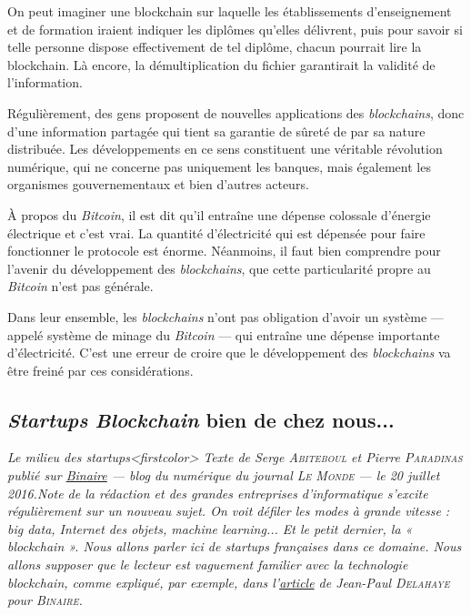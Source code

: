 %
On peut imaginer une blockchain sur laquelle les établissements d'enseignement et de formation iraient indiquer les diplômes qu'elles délivrent, puis pour savoir si telle personne dispose effectivement de tel diplôme, chacun pourrait lire la blockchain. 
Là encore, la démultiplication du fichier garantirait la validité de l'information. 

Régulièrement, des gens proposent de nouvelles applications des \textit{blockchains}, donc d'une information partagée qui tient sa garantie de sûreté de par sa nature distribuée. Les développements en ce sens constituent une véritable révolution numérique, qui ne concerne pas uniquement les banques, mais également les organismes gouvernementaux et bien d'autres acteurs.


À propos du \textit{Bitcoin}, il est dit qu'il entraîne une dépense colossale d'énergie électrique et c'est vrai. La quantité d'électricité qui est dépensée pour faire fonctionner le protocole est énorme. Néanmoins, il faut bien comprendre pour l'avenir du développement des \textit{blockchains}, que cette particularité propre au \textit{Bitcoin} n'est pas générale. 

Dans leur ensemble, les \textit{blockchains} n'ont pas obligation d'avoir un système --- appelé système de minage du \textit{Bitcoin} --- qui entraîne une dépense importante d'électricité. C'est une erreur de croire que le développement des \textit{blockchains} va être freiné par ces considérations. 


\subsection[\textit{Startups} bien de chez nous...]{\textit{Startups} \textit{Blockchain} bien de chez nous...}
\label{sub:II.3.2}

\begingroup\itshape
Le milieu des startups\caution[t]<firstcolor>{%
\upshape Texte de Serge \textsc{Abiteboul} et Pierre \textsc{Paradinas} publié sur \href{https://www.lemonde.fr/blog/binaire/2016/07/20/des-startups-blockchain-bien-de-chez-nous/}{Binaire} --- blog du numérique du journal \textsc{Le Monde} --- le 20 juillet 2016.}{\upshape Note de la rédaction}
 et des grandes entreprises d’informatique s’excite régulièrement sur un nouveau sujet. On voit défiler les modes à grande vitesse : \textup{big data}, Internet des objets, \textup{machine learning}... Et le petit dernier, la « \textup{blockchain} ». Nous allons parler ici de \textup{startups} françaises dans ce domaine. Nous allons supposer que le lecteur est vaguement familier avec la technologie \textup{blockchain}, comme expliqué, par exemple, dans l’\href{https://www.lemonde.fr/blog/binaire/2015/01/06/des-ordinateurs-au-dessus-des-attaques/}{article} de Jean-Paul \textsc{Delahaye} pour \textsc{Binaire}.
\endgroup

